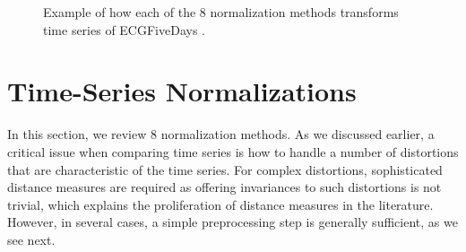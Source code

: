 \documentclass[11pt]{article}
\begin{document}
\begin{figure}[t!]
{{	}} 
	\vspace*{-0.2cm}
	\caption{Example of how each of the $8$ normalization methods transforms time series of ECGFiveDays \cite{UCRArchive2018}.}%
	\label{john_fig:normalizations}%
\end{figure}

\section{Time-Series Normalizations}
\label{john_sec:normalizations}
In this section, we review $8$ normalization methods. As we discussed earlier, a critical issue when comparing time series is how to handle a number of distortions that are characteristic of the time series. For complex distortions, sophisticated distance measures are required as offering invariances to such distortions is not trivial, which explains the proliferation of distance measures in the literature. However, in several cases, a simple preprocessing step is generally sufficient, as we see next.
\end{document}
